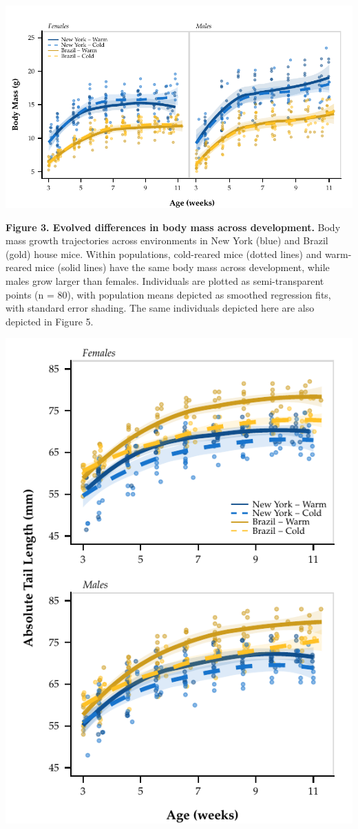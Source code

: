 \documentclass[]{article}
\begin{document}
\newpage

\includegraphics{../results/figures/Weekly_BW.pdf}

\textbf{Figure 3. Evolved differences in body mass across development.}
Body mass growth trajectories across environments in New York (blue) and
Brazil (gold) house mice. Within populations, cold-reared mice (dotted
lines) and warm-reared mice (solid lines) have the same body mass across
development, while males grow larger than females. Individuals are
plotted as semi-transparent points (n = 80), with population means
depicted as smoothed regression fits, with standard error shading. The
same individuals depicted here are also depicted in Figure 5.

\newpage

\includegraphics{../results/figures/Weekly_Tails.pdf}
\end{document}

